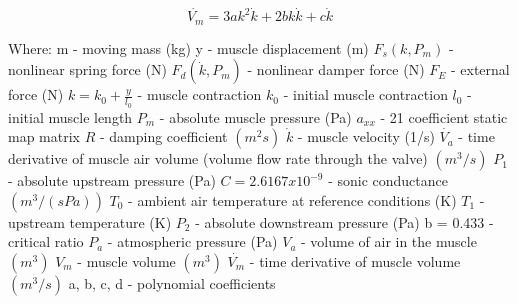 \documentclass[11pt,a4paper]{article}
\begin{document}
\begin{appendices}
\begin{equation}
    \dot{V_m} = 3ak^2\dot{k} + 2bk\dot{k} + c\dot{k}
\end{equation}

Where: \newline
m - moving mass (kg)\newline
y - muscle displacement (m)\newline
$F_s(k, P_m)$ - nonlinear spring force (N)\newline
$F_d(\dot{k}, P_m)$ - nonlinear damper force (N)\newline
$F_E$ - external force (N)\newline
$k = k_0 + \frac{y}{l_0}$ - muscle contraction\newline
$k_0$ - initial muscle contraction\newline
$l_0$ - initial muscle length\newline
$P_m$ - absolute muscle pressure (Pa)\newline
$a_{xx}$ - 21 coefficient static map matrix\newline
$R$ - damping coefficient $(m^2s)$\newline
$\dot{k}$ - muscle velocity (1/s)\newline
$\dot{V_a}$ - time derivative of muscle air volume (volume flow rate through the valve) $(m^3/s)$
$P_1$ - absolute upstream pressure (Pa)\newline
$C = 2.6167x10^{-9}$ - sonic conductance $(m^3/(sPa))$\newline
$T_0$ - ambient air temperature at reference conditions (K)\newline
$T_1$ - upstream temperature (K)\newline
$P_2$ - absolute downstream pressure (Pa)\newline
b = 0.433 - critical ratio\newline
$P_a$ - atmospheric pressure (Pa)\newline
$V_a$ - volume of air in the muscle $(m^3)$\newline
$V_m$ - muscle volume $(m^3)$\newline
$\dot{V_m}$ - time derivative of muscle volume $(m^3/s)$\newline
a, b, c, d - polynomial coefficients


\newpage
\end{appendices}
\printbibliography
\end{document}
